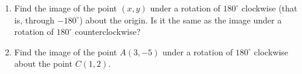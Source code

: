 \begin{enumerate}
\item[(a)] Find the image of the point $(x,y)$ under a rotation of $180^\circ$ clockwise (that is, through $-180^\circ$) about the origin. Is it the same as the image under a rotation of $180^\circ$ counterclockwise?
\item[(b)] Find the image of the point $A(3,-5)$ under a rotation of $180^\circ$ clockwise about the point $C(1,2)$.
\end{enumerate}
